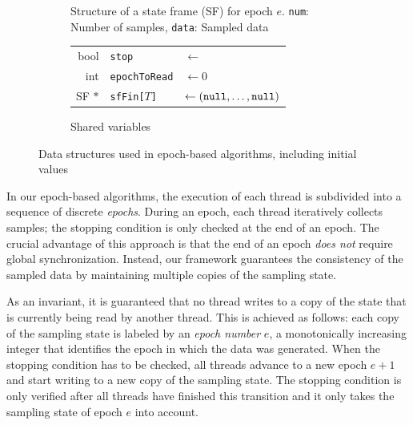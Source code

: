 \begin{figure}[t]%
\begin{subfigure}[t]{.48\textwidth}
\centering
{}%
\caption{Structure of a state frame (SF) for epoch $e$.
\texttt{num}: Number of samples, \texttt{data}: Sampled data}%
\label{fig:betw-apx:sf}
\end{subfigure}\hfill
\begin{subfigure}[t]{.48\textwidth}
\centering
\begin{tabular}{r@{\quad}l@{\quad}l}
	\textsf{bool} & \texttt{stop} &$\gets$ \false\\
	\textsf{int} & \texttt{epochToRead} &$\gets 0$\\
	SF $\ast$ & \texttt{sfFin[$T$]} &$\gets (\texttt{null}, \ldots, \texttt{null})$
\end{tabular}%
\caption{Shared variables}%
\label{fig:betw:apx:globalvars}
\end{subfigure}%
\caption{Data structures used in epoch-based algorithms, including initial values}%
\label{fig:betw-apx:epoch-state}
\end{figure}

In our epoch-based algorithms, the execution of each thread is subdivided into
a sequence of discrete \emph{epochs}.
During an epoch, each thread iteratively collects samples; the stopping
condition is only checked at the end of an epoch.
The crucial advantage of this approach is that the end of an epoch
\emph{does not} require global synchronization. Instead, our
framework guarantees the consistency of the sampled data by
maintaining multiple copies of the sampling state.

As an invariant, it is guaranteed that no thread writes to a copy of the state
that is currently being read by another thread. This is achieved as follows:
each copy of the sampling state is labeled by an \emph{epoch number} $e$, \ie a
monotonically increasing integer that identifies the epoch in which the data
was generated. When the stopping condition has to be checked, all threads
advance to a new epoch $e + 1$ and start writing to a new copy of the sampling
state.
The stopping condition is only verified after all threads have finished this
transition and it only takes the sampling state of epoch $e$ into account.

